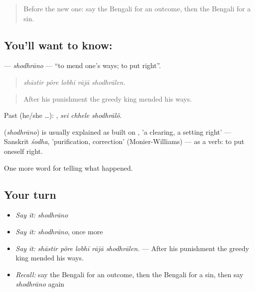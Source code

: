 \label{lesson:BN-C325-shodhrano}



\begin{quote}
Before the new one: say the Bengali for an outcome, then the Bengali for a sin.
\end{quote}

\subsection*{You'll want to know: }
\textbf{} — \emph{shodhrāno} — \textquotedblleft{}to mend one's ways; to put right\textquotedblright{}.

\begin{quote}
    
\end{quote}

\begin{quote}
\emph{shāstir pôre lobhī rājā shodhrālen.}
\end{quote}

\begin{quote}
After his punishment the greedy king mended his ways.
\end{quote}

Past (he/she …):   , \emph{sei chhele shodhrālô}.

\begin{cousinweb}
\textbf{} (\emph{shodhrāno}) is usually explained as built on , 'a clearing, a setting right' — Sanskrit \emph{śodha}, 'purification, correction' (Monier-Williams) — as a verb: to put oneself right.
\end{cousinweb}

\begin{grammarlens}[title={What you've built}]
One more word for telling what happened.
\end{grammarlens}

\subsection*{Your turn}
\begin{itemize}
\raggedright
  \item \emph{Say it:} \emph{shodhrāno}
  \item \emph{Say it:} \emph{shodhrāno}, once more
  \item \emph{Say it:} \emph{shāstir pôre lobhī rājā shodhrālen.} — After his punishment the greedy king mended his ways.
  \item \emph{Recall:} say the Bengali for an outcome, then the Bengali for a sin, then say \emph{shodhrāno} again
\end{itemize}

